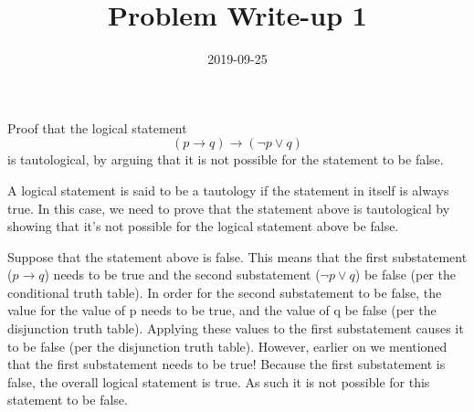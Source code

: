 \documentclass[a4paper,12pt]{article}
\title{Problem Write-up 1}
\date{2019-09-25}
\begin{document}
\begin{problem}
    Proof that the logical statement \[(p \to q) \to (\neg p \vee q)\] is tautological, by arguing that it is not possible for the statement to be false.
\end{problem}

\begin{answer}
   A logical statement is said to be a tautology if the statement in itself is always true. In this case, we need to prove that the statement above is tautological by showing that it's not possible for the logical statement above be false.

   Suppose that the statement above is false. This means that the first substatement (\(p \to q\)) needs to be true and the second substatement (\(\neg p \vee q\)) be false (per the conditional truth table). In order for the second substatement to be false, the value for the value of p needs to be true, and the value of q be false (per the disjunction truth table). Applying these values to the first substatement causes it to be false (per the disjunction truth table). However, earlier on we mentioned that the first substatement needs to be true! Because the first substatement is false, the overall logical statement is true. As such it is not possible for this statement to be false.
\end{answer}
\end{document}
